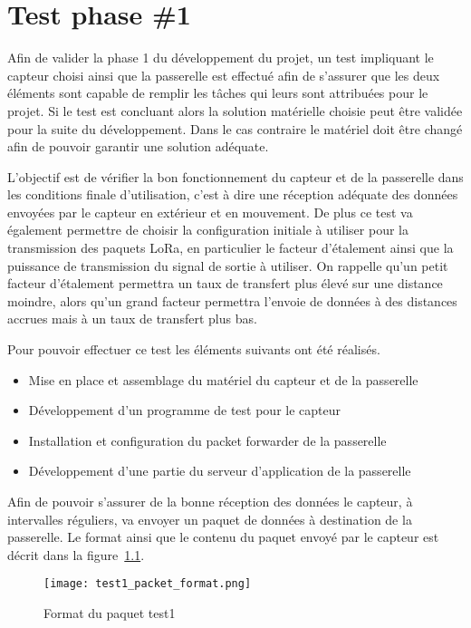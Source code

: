 \chapter{Test phase \#1}\label{ch:test_1}

Afin de valider la phase 1 du développement du projet, un test impliquant le capteur choisi ainsi que la passerelle est effectué afin de s'assurer que les deux éléments sont capable de remplir les tâches qui leurs sont attribuées pour le projet. Si le test est concluant alors la solution matérielle choisie peut être validée pour la suite du développement. Dans le cas contraire le matériel doit être changé afin de pouvoir garantir une solution adéquate.

L'objectif est de vérifier la bon fonctionnement du capteur et de la passerelle dans les conditions finale d'utilisation, c'est à dire une réception adéquate des données envoyées par le capteur en extérieur et en mouvement. De plus ce test va également permettre de choisir la configuration initiale à utiliser pour la transmission des paquets LoRa, en particulier le facteur d'étalement ainsi que la puissance de transmission du signal de sortie à utiliser. On rappelle qu'un petit facteur d'étalement permettra un taux de transfert plus élevé sur une distance moindre, alors qu'un grand facteur permettra l'envoie de données à des distances accrues mais à un taux de transfert plus bas.

Pour pouvoir effectuer ce test les éléments suivants ont été réalisés.

\begin{itemize}
\item Mise en place et assemblage du matériel du capteur et de la passerelle
\item Développement d'un programme de test pour le capteur
\item Installation et configuration du packet forwarder de la passerelle
\item Développement d'une partie du serveur d'application de la passerelle
\end{itemize}

Afin de pouvoir s'assurer de la bonne réception des données le capteur, à intervalles réguliers, va envoyer un paquet de données à destination de la passerelle. Le format ainsi que le contenu du paquet envoyé par le capteur est décrit dans la figure~\ref{fig:test1_paquet}.

\begin{figure}[htb]
\centering 
\texttt{[image: test1\_packet\_format.png]} 
\caption{Format du paquet test1}
\label{fig:test1_paquet}
\end{figure}

